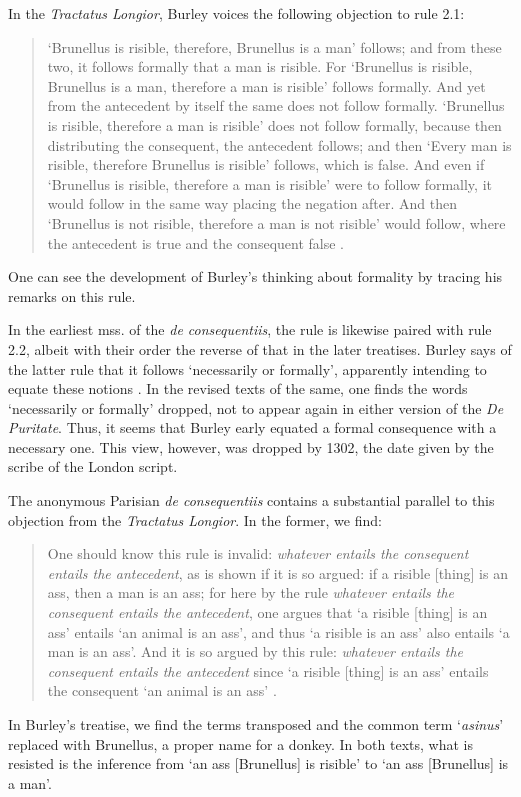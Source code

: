 \documentclass[]{birkjour}
\begin{document}
In the \textit{Tractatus Longior}, Burley voices the following objection to rule 2.1: 
\begin{quote}
	`Brunellus is risible, therefore, Brunellus is a man' follows; and from these two, it follows formally that a man is risible. For `Brunellus is risible, Brunellus is a man, therefore a man is risible' follows formally. And yet from the antecedent by itself the same does not follow formally. `Brunellus is risible, therefore a man is risible' does not follow formally, because then distributing the consequent, the antecedent follows; and then `Every man is risible, therefore Brunellus is risible' follows, which is false. And even if `Brunellus is risible, therefore a man is risible' were to follow formally, it would follow in the same way placing the negation after. And then `Brunellus is not risible, therefore a man is not risible' would follow, where the antecedent is true and the consequent false \autocite[p. 80.13-29]{BurleyDPAL}.
\end{quote}
One can see the development of Burley's thinking about formality by tracing his remarks on this rule.

In the earliest mss. of the \textit{de consequentiis}, the rule is likewise paired with rule 2.2, albeit with their order the reverse of that in the later treatises. Burley says of the latter rule that it follows `necessarily or formally', apparently intending to equate these notions \autocite[p. 132, par. 84]{Green-Pedersen1980b}. In the revised texts of the same, one finds the words `necessarily or formally' dropped, not to appear again in either version of the \textit{De Puritate}. Thus, it seems that Burley early equated a formal consequence with a necessary one. This view, however, was dropped by 1302, the date given by the scribe of the London script.

The anonymous Parisian \textit{de consequentiis} contains a substantial parallel to this objection from the \textit{Tractatus Longior}. In the former, we find: 
\begin{quote}
	One should know this rule is invalid: \textit{whatever entails the consequent entails the antecedent}, as is shown if it is so argued: if a risible [thing] is an ass, then a man is an ass; for here by the rule \textit{whatever entails the consequent entails the antecedent}, one argues that `a risible [thing] is an ass' entails `an animal is an ass', and thus `a risible is an ass' also entails `a man is an ass'. And it is so argued by this rule: \textit{whatever entails the consequent entails the antecedent} since `a risible [thing] is an ass' entails the consequent `an animal is an ass' \autocite[p. 16, par. 21]{Green-Pedersen1980a}.
\end{quote}
In Burley's treatise, we find the terms transposed and the common term `\textit{asinus}' replaced with Brunellus, a proper name for a donkey. In both texts, what is resisted is the inference from `an ass [Brunellus] is risible' to `an ass [Brunellus] is a man'. 
\end{document}
